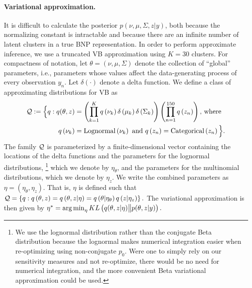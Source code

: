 %
\paragraph{Variational approximation.} It is difficult to calculate the
posterior $p\left(\nu, \mu, \Sigma, z \vert y\right)$, both because the
normalizing constant is intractable and because there are an infinite number of
latent clusters in a true BNP representation. In order to perform approximate
inference, we use a truncated VB approximation using $K=30$
clusters\citep{blei:2006:dirichletbnp}. For compactness of notation, let $\theta =
\left(\nu, \mu, \Sigma\right)$ denote the collection of ``global'' parameters,
i.e., parameters whose values affect the data-generating process of every
observation $y_n$.   Let $\delta\left(\cdot\right)$ denote a delta function. We
define a class of approximating distributions for VB as
%
\begin{align*}
\mathcal{Q} := \Big\{ q:
q(\theta, z) &=
\left(\prod_{k=1}^{K}q\left(\nu_{k}\right)\delta\left(\mu_{k}\right)
    \delta\left(\Sigma_{k}\right)\right)
    \left(\prod_{n=1}^{150}q\left(z_{n}\right) \right)\textrm{, where } \\
q\left(\nu_{k}\right) &= \mathrm{Lognormal}\left(\nu_k\right) \textrm{ and }
q\left(z_n\right) = \mathrm{Categorical}\left(z_n\right)
\Big\}.
\end{align*}
%
The family $\mathcal{Q}$ is parameterized by a finite-dimensional vector containing
the locations of the delta functions and the parameters for the lognormal
distributions,
%
\footnote{We use the lognormal distribution rather than the conjugate Beta
distribution because the lognormal makes numerical integration easier when
re-optimizing using non-conjugate $p_{0}$.  Were one to simply rely on our
sensitivity measures and not re-optimize, there would be no need for numerical
integration, and the more convenient Beta variational approximation could be
used.}
%
which we denote by $\eta_\theta$, and the parameters for the
multinomial distributions, which we denote by $\eta_z$. We write the combined
parameters as $\eta=\left(\eta_\theta, \eta_z\right)$. That is, $\eta$ is
defined such that
%
$\mathcal{Q} =
    \left\{q: q\left(\theta, z\right) =
            q\left(\theta, z \vert \eta \right) =
            q\left(\theta \vert \eta_\theta \right)
            q\left(z \vert \eta_z \right)
    \right\}.$
%
The variational approximation is then given by
%
$
\etaopt = \argmin_{\eta} KL\left(
    q(\theta, z \vert \eta) \big\| p(\theta, z | y)
    \right). %
$

